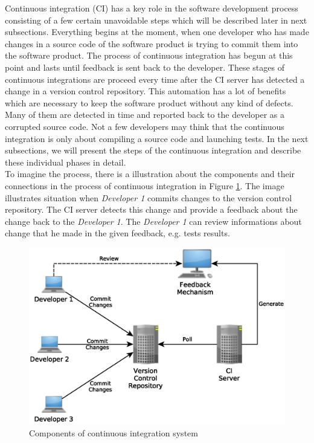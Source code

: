 Continuous integration (CI) has a key role in the software development process consisting of a few certain unavoidable steps which will be described later in next subsections. Everything begins at the moment, when one developer who has made changes in a source code of the software product is trying to commit them into the software product. The process of continuous integration has begun at this point and lasts until feedback is sent back to the developer. These stages of continuous integrations are proceed every time after the CI server has detected a change in a version control repository. This automation has a lot of benefits which are necessary to keep the software product without any kind of defects. Many of them are detected in time and reported back to the developer as a corrupted source code. Not a few developers may think that the continuous integration is only about compiling a source code and launching tests. In the next subsections, we will present the steps of the continuous integration and describe these individual phases in detail.\\

To imagine the process, there is a illustration about the components and their connections in the process of continuous integration in Figure \ref{fig:cocis}. The image illustrates situation when \textit{Developer 1} commits changes to the version control repository. The CI server detects this change and provide a feedback about the change back to the \textit{Developer 1}. The \textit{Developer 1} can review informations about change that he made in the given feedback, e.g. tests results.

\begin{figure}[H]
	\centering
	\includegraphics[scale=0.6]{yEd/components_of_CI_system.eps}
	\caption{Components of continuous integration system\cite{CIbook}}
	\label{fig:cocis}
\end{figure}

